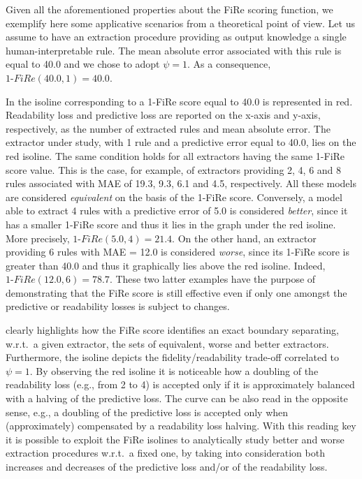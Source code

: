 \documentclass{article}
\newcommand{\fire}{FiRe}
\begin{document}
Given all the aforementioned properties about the \fire{} scoring function, we exemplify here some applicative scenarios from a theoretical point of view.
%
Let us assume to have an extraction procedure providing as output knowledge a single human-interpretable rule.
%
The mean absolute error associated with this rule is equal to 40.0 and we chose to adopt $\psi=1$.
%
As a consequence, $1\textrm{-}\fire(40.0, 1)=40.0$.

In  the isoline corresponding to a 1-\fire{} score equal to 40.0 is represented in red.
%
Readability loss and predictive loss are reported on the x-axis and y-axis, respectively, as the number of extracted rules and mean absolute error.
%
The extractor under study, with 1 rule and a predictive error equal to 40.0, lies on the red isoline.
%
The same condition holds for all extractors having the same 1-\fire{} score value.
%
This is the case, for example, of extractors providing 2, 4, 6 and 8 rules associated with MAE of 19.3, 9.3, 6.1 and 4.5, respectively.
%
All these models are considered \emph{equivalent} on the basis of the 1-\fire{} score.
%
Conversely, a model able to extract 4 rules with a predictive error of 5.0 is considered \emph{better}, since it has a smaller 1-\fire{} score and thus it lies in the graph under the red isoline.
%
More precisely, $1\textrm{-}\fire(5.0, 4)=21.4$.
%
On the other hand, an extractor providing 6 rules with MAE = 12.0 is considered \emph{worse}, since its 1-\fire{} score is greater than 40.0 and thus it graphically lies above the red isoline.
%
Indeed, $1\textrm{-}\fire(12.0, 6)=78.7$.
%
These two latter examples have the purpose of demonstrating that the \fire{} score is still effective even if only one amongst the predictive or readability losses is subject to changes.

 clearly highlights how the \fire{} score identifies an exact boundary separating, w.r.t.\ a given extractor, the sets of equivalent, worse and better extractors.
%
Furthermore, the isoline depicts the fidelity/readability trade-off correlated to $\psi=1$.
%
%
By observing the red isoline it is noticeable how a doubling of the readability loss (e.g., from 2 to 4) is accepted only if it is approximately balanced with a halving of the predictive loss.
%
The curve can be also read in the opposite sense, e.g., a doubling of the predictive loss is accepted only when (approximately) compensated by a readability loss halving.
%
With this reading key it is possible to exploit the \fire{} isolines to analytically study better and worse extraction procedures w.r.t.\ a fixed one, by taking into consideration both increases and decreases of the predictive loss and/or of the readability loss.
\end{document}

